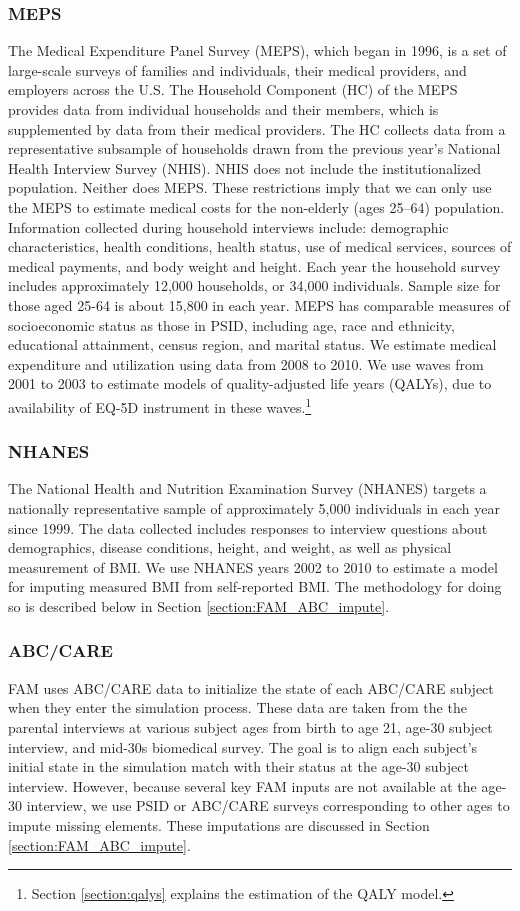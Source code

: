\subsubsection{MEPS}
\noindent The Medical Expenditure Panel Survey (MEPS), which began in 1996, is a set of large-scale surveys of families and individuals, their medical providers, and employers across the U.S. The Household Component (HC) of the MEPS provides data from
individual households and their members, which is supplemented by data from their medical providers.
The HC collects data from a representative subsample of households drawn from the
previous year's National Health Interview Survey (NHIS). NHIS does not include the
institutionalized population. Neither does MEPS. These restrictions imply that we can only use the MEPS to
estimate medical costs for the non-elderly (ages 25--64) population. Information collected during household
interviews include: demographic characteristics, health conditions, health status, use of medical
services, sources of medical payments, and body weight and height. Each year the household survey
includes approximately 12,000 households, or 34,000 individuals. Sample size for those aged 25-64 is
about 15,800 in each year. MEPS has comparable measures of socioeconomic status as those in PSID,
including age, race and ethnicity, educational attainment, census region, and marital status. We estimate medical expenditure
and utilization using data from 2008 to 2010. We use waves from 2001 to 2003 to estimate models of quality-adjusted life years (QALYs), due to availability of EQ-5D instrument in these waves.\footnote{Section \ref{section:qalys} explains the estimation of the QALY model.}


\subsubsection{NHANES}
\noindent
The National Health and Nutrition Examination Survey (NHANES) targets a nationally representative sample of approximately 5,000 individuals in each year since 1999. The data collected includes responses to interview questions about demographics, disease conditions, height, and weight, as well as physical measurement of BMI. We use NHANES years 2002 to 2010 to estimate a model for imputing measured BMI from self-reported BMI. The methodology for doing so is described below in Section \ref{section:FAM_ABC_impute}.

\subsubsection{ABC/CARE}
\noindent FAM uses ABC/CARE data to initialize the state of each ABC/CARE subject when they enter the simulation process.
These data are taken from the the parental interviews at various subject ages from birth to age 21, age-30 subject interview, and mid-30s biomedical survey.
The goal is to align each subject's initial state in the simulation match with their status at the age-30 subject interview. However, because several key FAM inputs are not available at the age-30 interview, we use PSID or ABC/CARE surveys corresponding to other ages to impute missing elements. These imputations are discussed in Section \ref{section:FAM_ABC_impute}.

